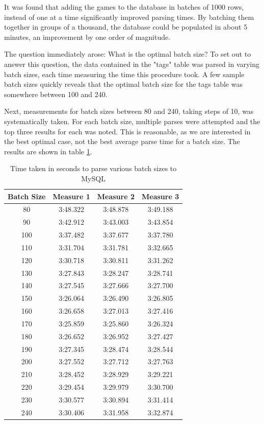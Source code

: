\documentclass{article}
\begin{document}
It was found that adding the games to the database in batches of 1000 rows,
instead of one at a time significantly improved parsing times. By batching them
together in groups of a thousand, the database could be populated in about 5
minutes, an improvement by one order of magnitude.

The question immediately arose:  What is the optimal batch size? To set out
to answer this question, the data contained in the "tags" table was parsed in
varying batch sizes, each time measuring the time this procedure took.  A
few sample batch sizes quickly reveals that the optimal batch size for the
tags table was somewhere between 100 and 240.

Next, measurements for batch sizes between 80 and
240, taking steps of 10, was systematically taken.  For each batch size,
multiple parses were attempted and the top three results for each was noted.
This is reasonable, as we are interested in the best optimal case, not the best
average parse time for a batch size.  The results are shown in table
\ref{table:1}.

\begin{table}[h!]
	\centering
	\begin{tabular}{||c c c c||}
		\hline
		Batch Size & Measure 1 & Measure 2 & Measure 3 \\ [0.5ex]
		\hline\hline
		80 & 3:48.322 & 3:48.878 & 3:49.188 \\ [0.5ex]
		\hline
		90 & 3:42.912 & 3:43.003 & 3:43.854 \\ [0.5ex]
		\hline
		100 & 3:37.482 & 3:37.677 & 3:37.780 \\ [0.5ex]
		\hline
		110 & 3:31.704 & 3:31.781 & 3:32.665 \\ [0.5ex]
		\hline
		120 & 3:30.718 & 3:30.811 & 3:31.262 \\ [0.5ex]
		\hline
		130 & 3:27.843 & 3:28.247 & 3:28.741 \\ [0.5ex]
		\hline
		140 & 3:27.545 & 3:27.666 & 3:27.700 \\ [0.5ex]
		\hline
		150 & 3:26.064 & 3:26.490 & 3:26.805 \\ [0.5ex]
		\hline
		160 & 3:26.658 & 3:27.013 & 3:27.416 \\ [0.5ex]
		\hline
		170 & 3:25.859 & 3:25.860 & 3:26.324 \\ [0.5ex]
		\hline
		180 & 3:26.652 & 3:26.952 & 3:27.427 \\ [0.5ex]
		\hline
		190 & 3:27.345 & 3:28.474 & 3:28.544 \\ [0.5ex]
		\hline
		200 & 3:27.552 & 3:27.712 & 3:27.763 \\ [0.5ex]
		\hline
		210 & 3:28.452 & 3:28.929 & 3:29.221 \\ [0.5ex]
		\hline
		220 & 3:29.454 & 3:29.979 & 3:30.700 \\ [0.5ex]
		\hline
		230 & 3:30.577 & 3:30.894 & 3:31.414 \\ [0.5ex]
		\hline
		240 & 3:30.406 & 3:31.958 & 3:32.874 \\ [0.5ex]
		\hline
	\end{tabular}
	\caption{Time taken in seconds to parse various batch sizes to MySQL}
	\label{table:1}
\end{table}
\end{document}
